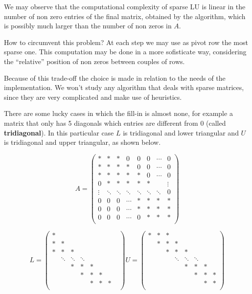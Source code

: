 \documentclass[computationalMathematics.tex]{subfiles}
\begin{document}
We may observe that the computational complexity of sparse LU is linear in the number of non zero entries of the final matrix, obtained by the algorithm, which is possibly much larger than the number of non zeros in $A$.

How to circumvent this problem? At each step we may use as pivot row the most sparse one. This computation may be done in a more sofisticate way, considering the ``relative'' position of non zeros between couples of rows.

Because of this trade-off the choice is made in relation to the needs of the implementation. We won't study any algorithm that deals with sparse matrices, since they are very complicated and make use of heuristics.

There are some lucky cases in which the fill-in is almost none, for example a matrix that only has 5 diagonals which entries are different from $0$ (called \textbf{tridiagonal}). In this particular case $L$ is tridiagonal and lower triangular and $U$ is tridiagonal and upper triangular, as shown below.

\[
A = \begin{pmatrix}
  \ast & \ast & \ast & 0 & 0 & 0  &\cdots & 0\\
  \ast & \ast & \ast & \ast & 0 & 0 & \cdots & 0\\
  \ast & \ast & \ast & \ast & \ast & 0 & \cdots & 0\\
  0 & \ast & \ast & \ast & \ast & \ast & & \vdots\\
  \vdots & \ddots & \ddots & \ddots & \ddots & \ddots & \ddots & 0\\
  0 & 0 & 0 & \cdots & \ast & \ast & \ast & \ast\\
  0 & 0 & 0 & \cdots & \ast & \ast & \ast & \ast\\
  0 & 0 & 0 & \cdots & 0 & \ast & \ast & \ast\\

\end{pmatrix}
\]

\[
L = \begin{pmatrix}
  \ast & & & & & & & \\
  \ast & \ast & & & & & \\
  \ast & \ast & \ast & & & & & \\
  & \ddots & \ddots & \ddots & & & \\
  & & \ast & \ast & \ast & & \\
  & & & \ast & \ast & \ast & \\
  & & & & \ast & \ast & \ast\\
\end{pmatrix}
U = \begin{pmatrix}
  \ast & \ast & \ast & & & & & \\
  & \ast & \ast & \ast & & & \\
  & & \ast & \ast & \ast & & & \\
  & & & \ddots & \ddots & \ddots & \\
  & & & & \ast & \ast & \ast & \\
  & & & & & \ast & \ast & \ast\\
  & & & & & & \ast & \ast\\
\end{pmatrix}
\]
\end{document}
